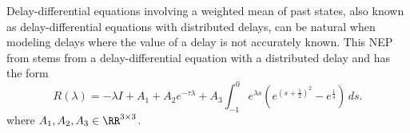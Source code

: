 \begin{problem}
Delay-differential equations involving a
weighted mean of past states,
also known as delay-differential
equations with distributed delays, can be
natural when modeling delays 
where the value of a
delay is not accurately known.
This NEP from \cite{Jarlebring:2012:INFARNDISTDELAY}
stems from a
delay-differential equation with a distributed delay
and 
has the form 
\[
 R(\lambda)=-\lambda I+A_1+A_2e^{-\tau\lambda}+A_3\int_{-1}^0
e^{\lambda s}(e^{(s+\frac12)^2}-e^{\frac14})\,ds.
\] 
where $A_1,A_2,A_3\in\RR^{3\times 3}$.
\end{problem}

